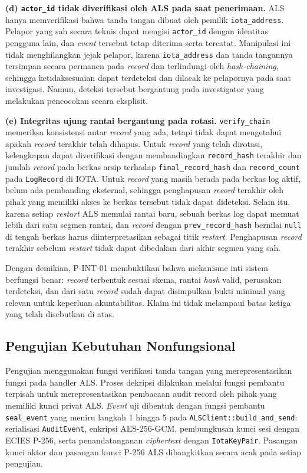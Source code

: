 \textbf{(d) \texttt{actor\_id} tidak diverifikasi oleh ALS pada saat
penerimaan.} ALS hanya memverifikasi bahwa tanda tangan dibuat oleh pemilik
\texttt{iota\_address}. Pelapor yang sah secara teknis dapat mengisi
\texttt{actor\_id} dengan identitas pengguna lain, dan \textit{event} tersebut
tetap diterima serta tercatat. Manipulasi ini tidak menghilangkan jejak pelapor,
karena \texttt{iota\_address} dan tanda tangannya tersimpan secara permanen
pada \textit{record} dan terlindungi oleh \textit{hash-chaining}, sehingga
ketidaksesuaian dapat terdeteksi dan dilacak ke pelapornya pada saat
investigasi. Namun, deteksi tersebut bergantung pada investigator yang
melakukan pencocokan secara eksplisit.

\textbf{(e) Integritas ujung rantai bergantung pada rotasi.}
\texttt{verify\_chain} memeriksa konsistensi antar \textit{record} yang ada,
tetapi tidak dapat mengetahui apakah \textit{record} terakhir telah dihapus.
Untuk \textit{record} yang telah dirotasi, kelengkapan dapat diverifikasi dengan
membandingkan \texttt{record\_hash} terakhir dan jumlah \textit{record} pada
berkas arsip terhadap \texttt{final\_record\_hash} dan \texttt{record\_count}
pada \texttt{LogRecord} di IOTA. Untuk \textit{record} yang masih berada pada
berkas log aktif, belum ada pembanding eksternal, sehingga penghapusan
\textit{record} terakhir oleh pihak yang memiliki akses ke berkas tersebut tidak
dapat dideteksi. Selain itu, karena setiap \textit{restart} ALS memulai rantai
baru, sebuah berkas log dapat memuat lebih dari satu segmen rantai, dan
\textit{record} dengan \texttt{prev\_record\_hash} bernilai \texttt{null} di
tengah berkas harus diinterpretasikan sebagai titik \textit{restart}.
Penghapusan \textit{record} terakhir sebelum \textit{restart} tidak dapat
dibedakan dari akhir segmen yang sah.
 
Dengan demikian, P-INT-01 membuktikan bahwa mekanisme inti sistem berfungsi
benar: \textit{record} terbentuk sesuai skema, rantai \textit{hash} valid,
perusakan terdeteksi, dan dari satu \textit{record} sudah dapat disimpulkan
bukti minimal yang relevan untuk keperluan akuntabilitas. Klaim ini tidak
melampaui batas ketiga yang telah disebutkan di atas.

\subsection{Pengujian Kebutuhan Nonfungsional}
\label{subsec:pengujian-nonfungsional}

Pengujian menggunakan fungsi verifikasi tanda tangan yang merepresentasikan fungsi pada handler ALS. Proses dekripsi dilakukan melalui fungsi pembantu terpisah untuk merepresentasikan pembacaan audit record oleh pihak yang memiliki kunci privat ALS. \textit{Event} uji dibentuk dengan fungsi pembantu \texttt{seal\_event} yang
meniru langkah 1 hingga 5 pada \texttt{ALSClient::build\_and\_send}: serialisasi
\texttt{AuditEvent}, enkripsi AES-256-GCM, pembungkusan kunci sesi dengan ECIES
P-256, serta penandatanganan \textit{ciphertext} dengan \texttt{IotaKeyPair}.
Pasangan kunci aktor dan pasangan kunci P-256 ALS dibangkitkan secara acak pada
setiap pengujian.

